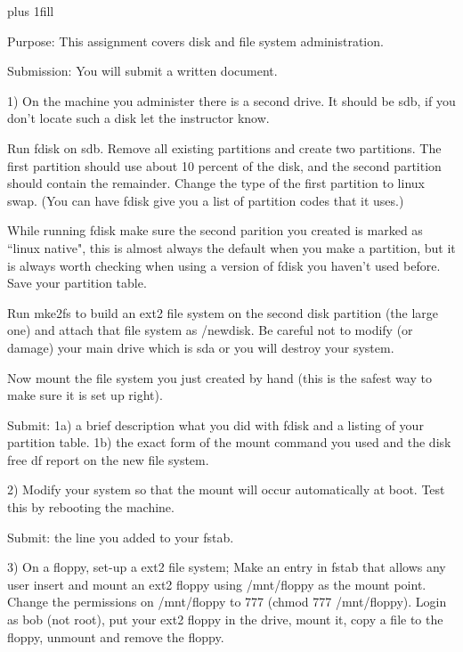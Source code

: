 
\rightskip=0pt plus 1fill

\parindent 0pt

Purpose: This assignment covers disk and file system administration.

Submission: You will submit a written document.

1) On the machine you administer there is a second drive.
It should be {\ltt{}sdb}, if you don't locate such a disk
let the instructor know.

Run {\ltt{}fdisk} on {\ltt{}sdb}.
Remove all existing partitions and create two partitions.
The first partition should use about 10 percent of the
disk, and the second partition should contain the remainder.
Change the type of the first partition to linux swap.
(You can have {\ltt{}fdisk} give you a list of partition codes that it uses.)

While running {\ltt{}fdisk} make sure the second parition
you created is marked as ``linux native", this is almost always the
default when you make a partition, but it is always worth checking
when using a version of {\ltt{}fdisk} you haven't used before.
Save your partition table.

Run {\ltt{}mke2fs} to build 
an ext2 file system on the second disk partition (the large
one) and attach that file system as {\ltt{}/newdisk}.
Be careful not to modify (or damage) your main drive
which is {\ltt{}sda} or you will destroy your system.

Now mount the file system you just created by hand
(this is the safest way to make sure it is set up right).

Submit: 
1a) a brief description what you did with {\ltt{}fdisk} and
a listing of your partition table.
1b) the exact form of the {\ltt{}mount} command you used and
the disk free {\ltt{}df} report on the new file system.

2) Modify your system so that the mount will 
occur automatically at boot.
Test this by rebooting the machine.

Submit: the line you added to your {\ltt{}fstab}.

3) On a floppy, set-up a ext2 file system;
Make an entry in {\ltt{}fstab} that allows any user insert and 
mount an ext2 floppy using {\ltt{}/mnt/floppy} as the mount point.
Change the permissions on {\ltt{}/mnt/floppy} to 777 ({\ltt{}chmod 777 /mnt/floppy}).
Login as bob (not root), put your ext2 floppy
in the drive,
mount it, copy a file to the floppy, unmount and remove the floppy.

